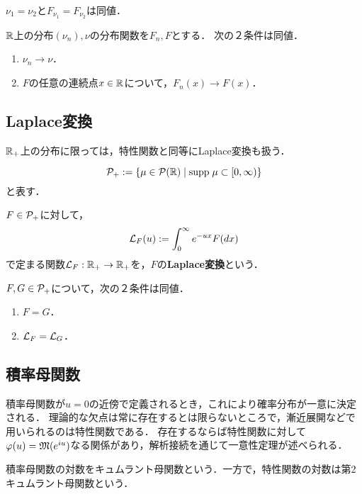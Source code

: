\documentclass[uplatex,dvipdfmx]{jsreport}
\begin{document}
\begin{proposition}[一意性定理]
    $\nu_1=\nu_2$と$F_{\nu_1}=F_{\nu_2}$は同値．
\end{proposition}

\begin{proposition}
    $\R$上の分布$(\nu_n),\nu$の分布関数を$F_n,F$とする．
    次の２条件は同値．
    \begin{enumerate}
        \item $\nu_n\to\nu$．
        \item $F$の任意の連続点$x\in\R$について，$F_n(x)\to F(x)$．
    \end{enumerate}
\end{proposition}

\subsection{Laplace変換}

\begin{tcolorbox}[colframe=ForestGreen, colback=ForestGreen!10!white,breakable,colbacktitle=ForestGreen!40!white,coltitle=black,fonttitle=\bfseries\sffamily,
title=]
    $\R_+$上の分布に限っては，特性関数と同等にLaplace変換も扱う．
\end{tcolorbox}

\begin{notation}
    \[\P_+:=\Brace{\mu\in\P(\R)\mid\supp\mu\subset[0,\infty)}\]
    と表す．
\end{notation}

\begin{definition}
    $F\in\P_+$に対して，
    \[\L_F(u):=\int^\infty_0e^{-ux}F(dx)\]
    で定まる関数$\L_F:\R_+\to\R_+$を，$F$の\textbf{Laplace変換}という．
\end{definition}

\begin{theorem}[一意性定理]
    $F,G\in\P_+$について，次の２条件は同値．
    \begin{enumerate}
        \item $F=G$．
        \item $\L_F=\L_G$．
    \end{enumerate}
\end{theorem}

\subsection{積率母関数}

\begin{tcolorbox}[colframe=ForestGreen, colback=ForestGreen!10!white,breakable,colbacktitle=ForestGreen!40!white,coltitle=black,fonttitle=\bfseries\sffamily,
title=]
    積率母関数が$u=0$の近傍で定義されるとき，これにより確率分布が一意に決定される．
    理論的な欠点は常に存在するとは限らないところで，漸近展開などで用いられるのは特性関数である．
    存在するならば特性関数に対して$\varphi(u)=\fM(e^{iu})$なる関係があり，解析接続を通じて一意性定理が述べられる．

    積率母関数の対数をキュムラント母関数という．一方で，特性関数の対数は第2キュムラント母関数という．
\end{tcolorbox}
\end{document}
